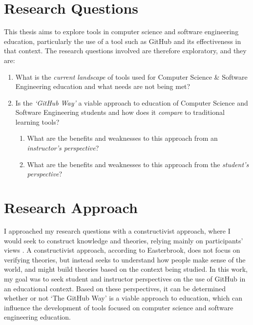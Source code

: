 
\section{Research Questions}
This thesis aims to explore tools in computer science and software engineering education, particularly the use of a tool such as GitHub and its effectiveness in that context. The research questions involved are therefore exploratory, and they are: \\
\begin{enumerate}
\item What is the \emph{current landscape} of tools used for Computer Science \& Software Engineering education and what needs are not being met?
\item Is the \emph{`GitHub Way'} a viable approach to education of Computer Science and Software Engineering students and how does it \emph{compare} to traditional learning tools?
\begin{enumerate}
    \item What are the benefits and weaknesses to this approach from an \emph{instructor's perspective}?
    \item What are the benefits and weaknesses to this approach from the \emph{student's perspective}?
\end{enumerate}
\end{enumerate}

\section{Research Approach}
I approached my research questions with a constructivist approach, where I would seek to construct knowledge and theories, relying mainly on participants' views \cite{easterbrook2008selecting}. A constructivist approach, according to Easterbrook, does not focus on verifying theories, but instead seeks to understand how people make sense of the world, and might build theories based on the context being studied. In this work, my goal was to seek student and instructor perspectives on the use of GitHub in an educational context. Based on these perspectives, it can be determined whether or not `The GitHub Way' is a viable approach to education, which can influence the development of tools focused on computer science and software engineering education.

